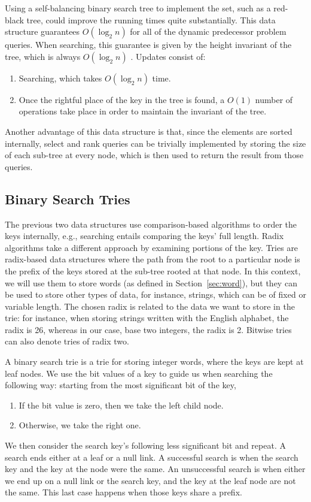 Using a self-balancing binary search tree to implement the set, such as a red-black tree, could improve the running times quite substantially.
This data structure guarantees $O(\log_2 n)$ for all of the dynamic predecessor problem queries.
When searching, this guarantee is given by the height invariant of the tree, which is always $O(\log_2 n)$ \cite{cormen2009introduction}.
Updates consist of:
\begin{enumerate}
    \item
    Searching, which takes $O(\log_2 n)$ time.
    
    \item
    Once the rightful place of the key in the tree is found, a $O(1)$ number of operations take place in order to maintain the invariant of the tree. 
\end{enumerate}

Another advantage of this data structure is that, since the elements are sorted internally, select and rank queries can be trivially implemented by storing the size of each sub-tree at every node, which is then used to return the result from those queries.

\subsection{Binary Search Tries}

The previous two data structures use comparison-based algorithms to order the keys internally, e.g., searching entails comparing the keys' full length.
Radix algorithms take a different approach by examining portions of the key.
Tries are radix-based data structures where the path from the root to a particular node is the prefix of the keys stored at the sub-tree rooted at that node.
In this context, we will use them to store words (as defined in Section~\ref{sec:word}), but they can be used to store other types of data, for instance, strings, which can be of fixed or variable length.
The chosen radix is related to the data we want to store in the trie: for instance, when storing strings written with the English alphabet, the radix is 26, whereas in our case, base two integers, the radix is 2. Bitwise tries can also denote tries of radix two.

A binary search trie is a trie for storing integer words, where the keys are kept at leaf nodes. We use the bit values of a key to guide us when searching the following way: starting from the most significant bit of the key,
\begin{enumerate}
    \item
    If the bit value is zero, then we take the left child node.
    \item 
    Otherwise, we take the right one.
\end{enumerate}
We then consider the search key's following less significant bit and repeat. A search ends either at a leaf or a null link. A successful search is when the search key and the key at the node were the same. An unsuccessful search is when either we end up on a null link or the search key, and the key at the leaf node are not the same. This last case happens when those keys share a prefix.

